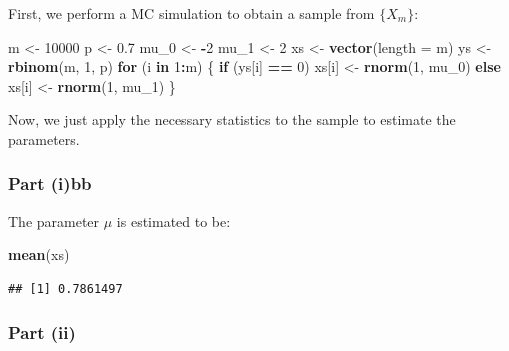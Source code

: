 \documentclass[
  12pt,
]{paper}
\newenvironment{Shaded}{\begin{snugshade}}{\end{snugshade}}
\newcommand{\AttributeTok}[1]{\textcolor[rgb]{0.13,0.29,0.53}{#1}}
\newcommand{\ControlFlowTok}[1]{\textcolor[rgb]{0.13,0.29,0.53}{\textbf{#1}}}
\newcommand{\DecValTok}[1]{\textcolor[rgb]{0.00,0.00,0.81}{#1}}
\newcommand{\FloatTok}[1]{\textcolor[rgb]{0.00,0.00,0.81}{#1}}
\newcommand{\FunctionTok}[1]{\textcolor[rgb]{0.13,0.29,0.53}{\textbf{#1}}}
\newcommand{\NormalTok}[1]{#1}
\newcommand{\OtherTok}[1]{\textcolor[rgb]{0.56,0.35,0.01}{#1}}
\newcommand{\SpecialCharTok}[1]{\textcolor[rgb]{0.81,0.36,0.00}{\textbf{#1}}}
\begin{document}

First, we perform a MC simulation to obtain a sample from \(\{X_m\}\):

\begin{Shaded}
\begin{Highlighting}[]
\NormalTok{m }\OtherTok{\textless{}{-}} \DecValTok{10000}
\NormalTok{p }\OtherTok{\textless{}{-}} \FloatTok{0.7}
\NormalTok{mu\_0 }\OtherTok{\textless{}{-}} \SpecialCharTok{{-}}\DecValTok{2}
\NormalTok{mu\_1 }\OtherTok{\textless{}{-}} \DecValTok{2}
\NormalTok{xs }\OtherTok{\textless{}{-}} \FunctionTok{vector}\NormalTok{(}\AttributeTok{length =}\NormalTok{ m)}
\NormalTok{ys }\OtherTok{\textless{}{-}} \FunctionTok{rbinom}\NormalTok{(m, }\DecValTok{1}\NormalTok{, p)}
\ControlFlowTok{for}\NormalTok{ (i }\ControlFlowTok{in} \DecValTok{1}\SpecialCharTok{:}\NormalTok{m) \{}
    \ControlFlowTok{if}\NormalTok{ (ys[i] }\SpecialCharTok{==} \DecValTok{0}\NormalTok{)}
\NormalTok{        xs[i] }\OtherTok{\textless{}{-}} \FunctionTok{rnorm}\NormalTok{(}\DecValTok{1}\NormalTok{, mu\_0) }\ControlFlowTok{else}\NormalTok{ xs[i] }\OtherTok{\textless{}{-}} \FunctionTok{rnorm}\NormalTok{(}\DecValTok{1}\NormalTok{, mu\_1)}
\NormalTok{\}}
\end{Highlighting}
\end{Shaded}

Now, we just apply the necessary statistics to the sample to estimate
the parameters.

\hypertarget{part-ibb}{%
\subsubsection{Part (i)bb}\label{part-ibb}}

The parameter \(\mu\) is estimated to be:

\begin{Shaded}
\begin{Highlighting}[]
\FunctionTok{mean}\NormalTok{(xs)}
\end{Highlighting}
\end{Shaded}

\begin{verbatim}
## [1] 0.7861497
\end{verbatim}

\hypertarget{part-ii}{%
\subsubsection{Part (ii)}\label{part-ii}}
\end{document}
